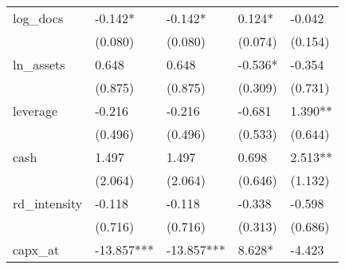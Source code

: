 \begin{table}
\begin{center}
\begin{tabular}{lllll}
log\_docs         & -0.142*                                   & -0.142*                                         & 0.124*                                  & -0.042                                                 \\
                  & (0.080)                                   & (0.080)                                         & (0.074)                                 & (0.154)                                                \\
ln\_assets        & 0.648                                     & 0.648                                           & -0.536*                                 & -0.354                                                 \\
                  & (0.875)                                   & (0.875)                                         & (0.309)                                 & (0.731)                                                \\
leverage          & -0.216                                    & -0.216                                          & -0.681                                  & 1.390**                                                \\
                  & (0.496)                                   & (0.496)                                         & (0.533)                                 & (0.644)                                                \\
cash              & 1.497                                     & 1.497                                           & 0.698                                   & 2.513**                                                \\
                  & (2.064)                                   & (2.064)                                         & (0.646)                                 & (1.132)                                                \\
rd\_intensity     & -0.118                                    & -0.118                                          & -0.338                                  & -0.598                                                 \\
                  & (0.716)                                   & (0.716)                                         & (0.313)                                 & (0.686)                                                \\
capx\_at          & -13.857***                                & -13.857***                                      & 8.628*                                  & -4.423                                                 \\

\end{tabular}
\end{center}
\end{table}
